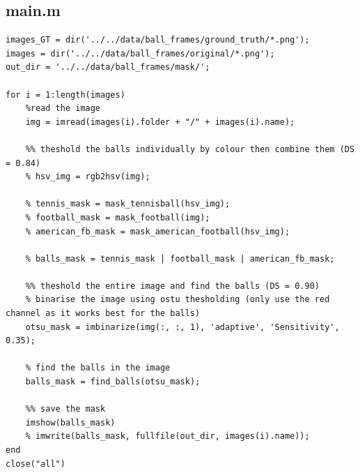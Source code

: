 \documentclass[conference]{IEEEtran}
\begin{document}
        \subsection{main.m}
            \begin{lstlisting}[style=Matlab-editor, basicstyle=\scriptsize]
%loop through all the images in ../../data/ball_frames
images_GT = dir('../../data/ball_frames/ground_truth/*.png');
images = dir('../../data/ball_frames/original/*.png');
out_dir = '../../data/ball_frames/mask/';

for i = 1:length(images)
    %read the image
    img = imread(images(i).folder + "/" + images(i).name);
    
    %% theshold the balls individually by colour then combine them (DS = 0.84)
    % hsv_img = rgb2hsv(img);
    
    % tennis_mask = mask_tennisball(hsv_img);
    % football_mask = mask_football(img);
    % american_fb_mask = mask_american_football(hsv_img);
    
    % balls_mask = tennis_mask | football_mask | american_fb_mask;
    
    %% theshold the entire image and find the balls (DS = 0.90)
    % binarise the image using ostu thesholding (only use the red channel as it works best for the balls)
    otsu_mask = imbinarize(img(:, :, 1), 'adaptive', 'Sensitivity', 0.35);
    
    % find the balls in the image
    balls_mask = find_balls(otsu_mask);
    
    %% save the mask
    imshow(balls_mask)
    % imwrite(balls_mask, fullfile(out_dir, images(i).name));
end
close("all")       
            \end{lstlisting}
\end{document}
